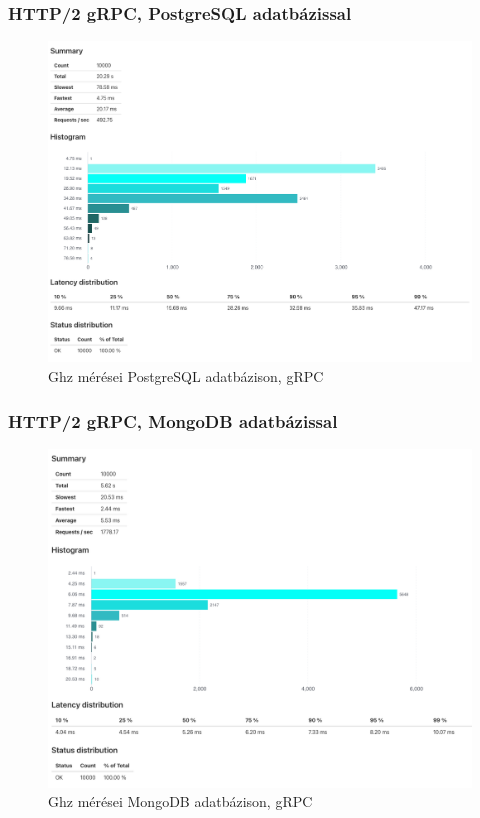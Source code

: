 \subsubsection{HTTP/2 gRPC, PostgreSQL adatbázissal}

\begin{figure}[hbt!]
    \centering
    \includegraphics[scale=0.3]{images/ghz-postgres}
    \caption{Ghz mérései PostgreSQL adatbázison, gRPC}
    \label{fig:ghz-postgres}
\end{figure}

\subsubsection{HTTP/2 gRPC, MongoDB adatbázissal}
\begin{figure}[hbt!]
    \centering
    \includegraphics[scale=0.3]{images/ghz-mongo}
    \caption{Ghz mérései MongoDB adatbázison, gRPC}
    \label{fig:ghz-mongo}
\end{figure}



